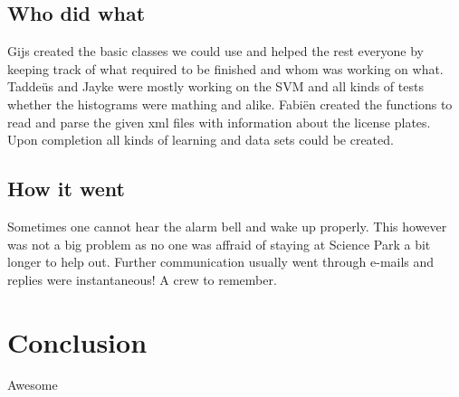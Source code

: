 \documentclass[a4paper]{article}
\begin{document}
\subsection{Who did what}
Gijs created the basic classes we could use and helped the rest everyone by 
keeping track of what required to be finished and whom was working on what. 
Tadde\"us and Jayke were mostly working on the SVM and all kinds of tests
whether the histograms were mathing and alike. Fabi\"en created the functions
to read and parse the given xml files with information about the license plates.
Upon completion all kinds of learning and data sets could be created.


\subsection{How it went}

Sometimes one cannot hear the alarm bell and wake up properly. This however was
not a big problem as no one was affraid of staying at Science Park a bit longer
to help out. Further communication usually went through e-mails and replies
were instantaneous! A crew to remember.

\section{Conclusion}

Awesome
\end{document}

